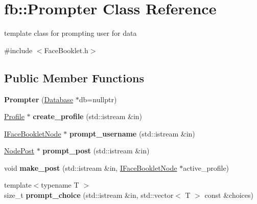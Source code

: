 \hypertarget{classfb_1_1_prompter}{\section{fb\+:\+:Prompter Class Reference}
\label{classfb_1_1_prompter}
}


template class for prompting user for data  




{\ttfamily \#include $<$Face\+Booklet.\+h$>$}

\subsection*{Public Member Functions}
\begin{DoxyCompactItemize}
\item 
\hypertarget{classfb_1_1_prompter_a7dbcc71b2ed5e9db623b5f9df7642b19}{{\bfseries Prompter} (\hyperlink{classfb_1_1_database}{Database} $\ast$db=nullptr)}\label{classfb_1_1_prompter_a7dbcc71b2ed5e9db623b5f9df7642b19}

\item 
\hypertarget{classfb_1_1_prompter_a3f86d0c8f58c34de5d49709f5bae7c42}{\hyperlink{classfb_1_1_profile}{Profile} $\ast$ {\bfseries create\+\_\+profile} (std\+::istream \&in)}\label{classfb_1_1_prompter_a3f86d0c8f58c34de5d49709f5bae7c42}

\item 
\hypertarget{classfb_1_1_prompter_aebfce67c651d96418fb616d03f0e3049}{\hyperlink{structfb_1_1_i_face_booklet_node}{I\+Face\+Booklet\+Node} $\ast$ {\bfseries prompt\+\_\+username} (std\+::istream \&in)}\label{classfb_1_1_prompter_aebfce67c651d96418fb616d03f0e3049}

\item 
\hypertarget{classfb_1_1_prompter_a1e287db4e05c6cb7acfa92a2a1f79d5c}{\hyperlink{structfb_1_1_node_post}{Node\+Post} $\ast$ {\bfseries prompt\+\_\+post} (std\+::istream \&in)}\label{classfb_1_1_prompter_a1e287db4e05c6cb7acfa92a2a1f79d5c}

\item 
\hypertarget{classfb_1_1_prompter_a1a60c2120c10e632a2a7f1128250b7f4}{void {\bfseries make\+\_\+post} (std\+::istream \&in, \hyperlink{structfb_1_1_i_face_booklet_node}{I\+Face\+Booklet\+Node} $\ast$active\+\_\+profile)}\label{classfb_1_1_prompter_a1a60c2120c10e632a2a7f1128250b7f4}

\item 
\hypertarget{classfb_1_1_prompter_a18da30617871ddfb82f67d0a2e908a7a}{{\footnotesize template$<$typename T $>$ }\\size\+\_\+t {\bfseries prompt\+\_\+choice} (std\+::istream \&in, std\+::vector$<$ T $>$ const \&choices)}\label{classfb_1_1_prompter_a18da30617871ddfb82f67d0a2e908a7a}

\end{DoxyCompactItemize}
